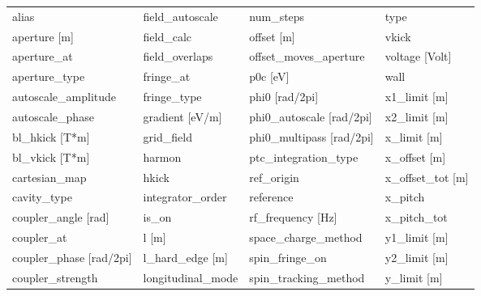  \begin{tabular}{llll} \toprule
alias                            & field_autoscale                  & num_steps                        & type                             \\
aperture [m]                     & field_calc                       & offset [m]                       & vkick                            \\
aperture_at                      & field_overlaps                   & offset_moves_aperture            & voltage [Volt]                   \\
aperture_type                    & fringe_at                        & p0c [eV]                         & wall                             \\
autoscale_amplitude              & fringe_type                      & phi0 [rad/2pi]                   & x1_limit [m]                     \\
autoscale_phase                  & gradient [eV/m]                  & phi0_autoscale [rad/2pi]         & x2_limit [m]                     \\
bl_hkick [T*m]                   & grid_field                       & phi0_multipass [rad/2pi]         & x_limit [m]                      \\
bl_vkick [T*m]                   & harmon                           & ptc_integration_type             & x_offset [m]                     \\
cartesian_map                    & hkick                            & ref_origin                       & x_offset_tot [m]                 \\
cavity_type                      & integrator_order                 & reference                        & x_pitch                          \\
coupler_angle [rad]              & is_on                            & rf_frequency [Hz]                & x_pitch_tot                      \\
coupler_at                       & l [m]                            & space_charge_method              & y1_limit [m]                     \\
coupler_phase [rad/2pi]          & l_hard_edge [m]                  & spin_fringe_on                   & y2_limit [m]                     \\
coupler_strength                 & longitudinal_mode                & spin_tracking_method             & y_limit [m]                      \\

\end{tabular}
